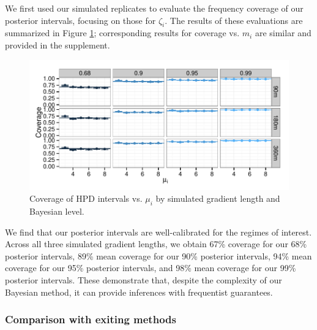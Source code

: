 We first used our simulated replicates to evaluate the frequency coverage of our posterior intervals, focusing on those for $\zeta_i$.
The results of these evaluations are summarized in Figure \ref{proteomics:fig:coverage_mu_hpd}; corresponding results for coverage vs. $m_i$ are similar and provided in the supplement.
%
\begin{figure}
\centering
\includegraphics[width=\textwidth, page=1]{figures/proteomics/figures_coverage_sim}
\caption{Coverage of HPD intervals vs. $\mu_i$ by simulated gradient length and Bayesian level.
\label{proteomics:fig:coverage_mu_hpd}}
\end{figure}
%
We find that our posterior intervals are well-calibrated for the regimes of interest.
Across all three simulated gradient lengths, we obtain 67\% coverage for our 68\% posterior intervals, 89\% mean coverage for our 90\% posterior intervals, 94\% mean coverage for our 95\% posterior intervals, and 98\% mean coverage for our 99\% posterior intervals.
These demonstrate that, despite the complexity of our Bayesian method, it can provide inferences with frequentist guarantees.


\subsubsection{Comparison with exiting methods}
\label{proteomics:sec:compperf}

